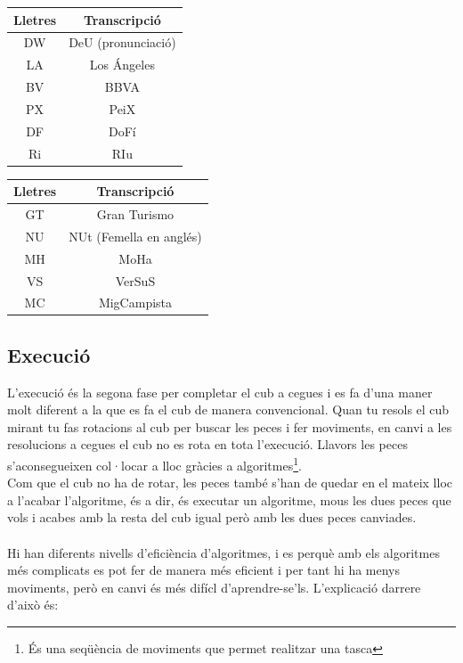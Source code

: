 \begin{table}[h]
    \begin{minipage}{.5\linewidth}
        \centering
        \begin{tabular}{|c|c|}
            \hline
            Lletres & Transcripció\\
            \hline
            DW & DeU (pronunciació)\\
            \hline
            LA & Los Ángeles\\
            \hline
            BV & BBVA\\
            \hline
            PX & PeiX\\
            \hline
            DF &  DoFí\\
            \hline 
            Ri & RIu  \\
            \hline
        \end{tabular}
    \end{minipage}
    \begin{minipage}{.5\linewidth}
        \centering
        \begin{tabular}{|c|c|}
            \hline
            Lletres & Transcripció\\
            \hline
            GT & Gran Turismo \\
            \hline
            NU & NUt (Femella en anglés)\\
            \hline
            MH & MoHa\\
            \hline
            VS &  VerSuS\\
            \hline 
            MC &  MigCampista\\
            \hline
        \end{tabular}
    \end{minipage} 
\end{table}





\subsection{Execució}

L'execució és la segona fase per completar el cub a cegues i es fa d'una maner molt diferent a la que es fa el cub de manera convencional. Quan tu resols el cub mirant tu fas rotacions al cub per buscar les peces i fer moviments, en canvi a les resolucions a cegues el cub no es rota en tota l'execució. Llavors les peces s'aconsegueixen col·locar a lloc gràcies a algoritmes\footnote{És una seqüència de moviments que permet realitzar una tasca}.
\\Com que el cub no ha de rotar, les peces també s'han de quedar en el mateix lloc a l'acabar l'algoritme, és a dir, és executar un algoritme, mous les dues peces que vols i acabes amb la resta del cub igual però amb les dues peces canviades. 
\\\\Hi han diferents nivells d'eficiència d'algoritmes, i es perquè amb els algoritmes més complicats es pot fer de manera més eficient i per tant hi ha menys moviments, però en canvi és més difícl d'aprendre-se'ls. L'explicació darrere d'això és:

